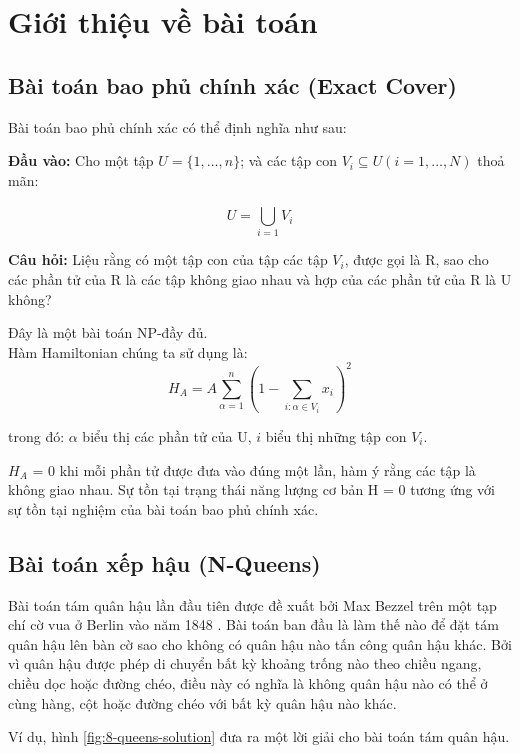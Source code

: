 \section{Giới thiệu về bài toán}
\subsection{Bài toán bao phủ chính xác (Exact Cover)}

Bài toán bao phủ chính xác có thể định nghĩa như sau: \cite{Ising formulations}

\textbf{Đầu vào: } Cho một tập $U = \{1, \dots, n \}$; và các tập con $V_i \subseteq U (i = 1, \dots, N)$ thoả mãn:

$$U = \bigcup_{i=1}^{} V_i$$


\textbf{Câu hỏi:} Liệu rằng có một tập con của tập các tập {$V_i$}, được gọi là R, sao cho các phần tử của R là các tập không giao nhau và hợp của các phần tử của R là U không?

Đây là một bài toán NP-đầy đủ.\\
Hàm Hamiltonian chúng ta sử dụng là: 
\[ H_A = A \sum_{\alpha=1}^{n} \left(1 - \sum_{i:\alpha \in V_i} x_i\right)^2\]

trong đó: $\alpha$ biểu thị các phần tử của U, $i$ biểu thị những tập con $V_i$. 

$H_A$ = 0 khi mỗi phần tử được đưa vào đúng một lần, hàm ý rằng các tập là không giao nhau. Sự tồn tại trạng thái năng lượng cơ bản H = 0 tương ứng với sự tồn tại nghiệm của bài toán bao phủ chính xác.

\subsection{Bài toán xếp hậu (N-Queens)}
Bài toán tám quân hậu lần đầu tiên được đề xuất bởi Max Bezzel trên một tạp chí cờ vua ở Berlin vào năm 1848 \cite{Proposal of eight queens problem}. Bài toán ban đầu là làm thế nào để đặt tám quân hậu lên bàn cờ sao cho không có quân hậu nào tấn công quân hậu khác. Bởi vì quân hậu được phép di chuyển bất kỳ khoảng trống nào theo chiều ngang, chiều dọc hoặc đường chéo, điều này có nghĩa là không quân hậu nào có thể ở cùng hàng, cột hoặc đường chéo với bất kỳ quân hậu nào khác.

Ví dụ, hình \ref{fig:8-queens-solution} đưa ra một lời giải cho bài toán tám quân hậu.

%	

